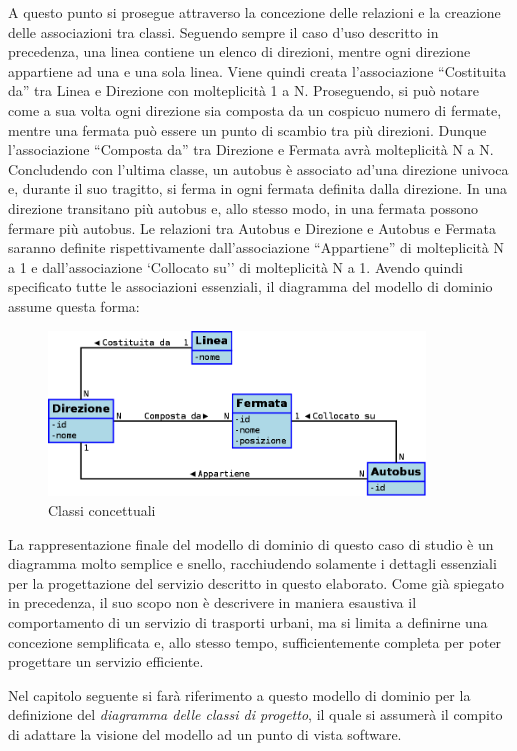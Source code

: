 A questo punto si prosegue attraverso la concezione delle relazioni e la creazione delle associazioni tra classi.
Seguendo sempre il caso d'uso descritto in precedenza, una linea contiene un elenco di direzioni, mentre ogni direzione appartiene ad una e una sola linea. Viene quindi creata l'associazione ``Costituita da'' tra Linea e Direzione con molteplicità 1 a N.
Proseguendo, si può notare come a sua volta ogni direzione sia composta da un cospicuo numero di fermate, mentre una fermata può essere un punto di scambio tra più direzioni. Dunque l'associazione ``Composta da'' tra Direzione e Fermata avrà molteplicità N a N.
Concludendo con l'ultima classe, un autobus è associato ad'una direzione univoca e, durante il suo tragitto, si ferma in ogni fermata definita dalla direzione. In una direzione transitano più autobus e, allo stesso modo, in una fermata possono fermare più autobus. Le relazioni tra Autobus e Direzione e Autobus e Fermata saranno definite rispettivamente dall'associazione ``Appartiene'' di molteplicità N a 1 e dall'associazione `Collocato su'' di molteplicità N a 1.
\newpage
Avendo quindi specificato tutte le associazioni essenziali, il diagramma del modello di dominio assume questa forma:

\begin{figure}[htbp]
\begin{center}
\includegraphics[width=10cm]{contents/images/modelloDominio}
\end{center}
\caption{Classi concettuali}
\label{fig:domain_model}
\end{figure}

La rappresentazione finale del modello di dominio di questo caso di studio è un diagramma molto semplice e snello, racchiudendo solamente i dettagli essenziali per la progettazione del servizio descritto in questo elaborato.
Come già spiegato in precedenza, il suo scopo non è descrivere in maniera esaustiva il comportamento di un servizio di trasporti urbani, ma si limita a definirne una concezione semplificata e, allo stesso tempo, sufficientemente completa per poter progettare un servizio efficiente.

Nel capitolo seguente si farà riferimento a questo modello di dominio per la definizione del {\itshape diagramma delle classi di progetto}, il quale si assumerà il compito di adattare la visione del modello ad un punto di vista software.

\newpage